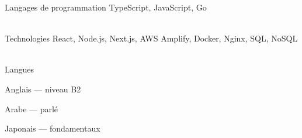 

\begin{cvskills}

  \cvskill
  {Langages de programmation} %
  {TypeScript, JavaScript, Go} %

  \\

  \cvskill
  {Technologies} %
  {React, Node.js, Next.js, AWS Amplify, Docker, Nginx, SQL, NoSQL}  %

  \\

  \cvskill
    {Langues} %
    {
      \begin{cvitems} %
        \item {Anglais — niveau B2}
        \item {Arabe — parlé}
        \item {Japonais — fondamentaux}
      \end{cvitems}
    }

\end{cvskills}
